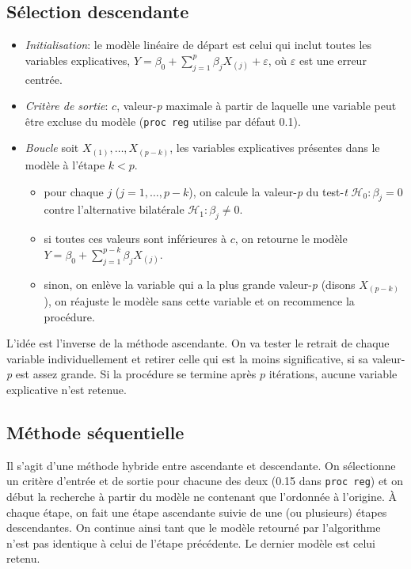 \documentclass[
  11pt,
  letterpaper,
]{book}
\providecommand{\tightlist}{%
  \setlength{\itemsep}{0pt}\setlength{\parskip}{0pt}}
\theoremstyle{definition}
\theoremstyle{definition}
\theoremstyle{definition}
\theoremstyle{remark}
\begin{document}
\hypertarget{suxe9lection-descendante}{%
\subsection{Sélection descendante}\label{suxe9lection-descendante}}

\begin{itemize}
\tightlist
\item
  \emph{Initialisation}: le modèle linéaire de départ est celui qui inclut toutes les variables explicatives, \(Y=\beta_0+\sum_{j=1}^p \beta_j X_{(j)}+\varepsilon\), où \(\varepsilon\) est une erreur centrée.
\item
  \emph{Critère de sortie}: \(c\), valeur-\emph{p} maximale à partir de laquelle une variable peut être excluse du modèle (\texttt{proc\ reg} utilise par défaut 0.1).
\item
  \emph{Boucle} soit \(X_{(1)}, \ldots, X_{(p-k)}\), les variables explicatives présentes dans le modèle à l'étape \(k<p\).

  \begin{itemize}
  \tightlist
  \item
    pour chaque \(j\) (\(j =1, \ldots, p-k\)), on calcule la valeur-\emph{p} du test-\emph{t} \(\mathcal{H}_0: \beta_{j}=0\) contre l'alternative bilatérale \(\mathcal{H}_1: \beta_{j} \neq 0\).
  \item
    si toutes ces valeurs sont inférieures à \(c\), on retourne le modèle \(Y=\beta_0 + \sum_{j=1}^{p-k} \beta_j X_{(j)}\).
  \item
    sinon, on enlève la variable qui a la plus grande valeur-\emph{p} (disons \(X_{(p-k)}\)), on réajuste le modèle sans cette variable et on recommence la procédure.
  \end{itemize}
\end{itemize}

L'idée est l'inverse de la méthode ascendante. On va tester le retrait de chaque variable individuellement et retirer celle qui est la moins significative, si sa valeur-\emph{p} est assez grande. Si la procédure se termine après \(p\) itérations, aucune variable explicative n'est retenue.

\hypertarget{muxe9thode-suxe9quentielle}{%
\subsection{Méthode séquentielle}\label{muxe9thode-suxe9quentielle}}

Il s'agit d'une méthode hybride entre ascendante et descendante. On sélectionne un critère d'entrée et de sortie pour chacune des deux (0.15 dans \texttt{proc\ reg}) et on début la recherche à partir du modèle ne contenant que l'ordonnée à l'origine. À chaque étape, on fait une étape ascendante suivie de une (ou plusieurs) étapes descendantes. On continue ainsi tant que le modèle retourné par l'algorithme n'est pas identique à celui de l'étape précédente. Le dernier modèle est celui retenu.
\end{document}
